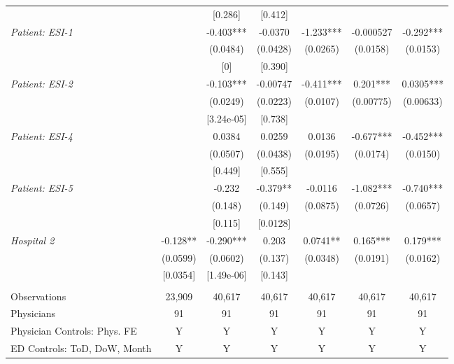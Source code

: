 \begin{table}[htbp]
{\begin{threeparttable}[t]
\begin{tabular}{lcccccc}
          &       & [0.286] & [0.412] &       &       &  \\
    \textit{Patient: ESI-1} &       & -0.403*** & -0.0370 & -1.233*** & -0.000527 & -0.292*** \\
          &       & (0.0484) & (0.0428) & (0.0265) & (0.0158) & (0.0153) \\
          &       & [0]   & [0.390] &       &       &  \\
    \textit{Patient: ESI-2} &       & -0.103*** & -0.00747 & -0.411*** & 0.201*** & 0.0305*** \\
          &       & (0.0249) & (0.0223) & (0.0107) & (0.00775) & (0.00633) \\
          &       & [3.24e-05] & [0.738] &       &       &  \\
    \textit{Patient: ESI-4} &       & 0.0384 & 0.0259 & 0.0136 & -0.677*** & -0.452*** \\
          &       & (0.0507) & (0.0438) & (0.0195) & (0.0174) & (0.0150) \\
          &       & [0.449] & [0.555] &       &       &  \\
    \textit{Patient: ESI-5} &       & -0.232 & -0.379** & -0.0116 & -1.082*** & -0.740*** \\
          &       & (0.148) & (0.149) & (0.0875) & (0.0726) & (0.0657) \\
          &       & [0.115] & [0.0128] &       &       &  \\
    \textit{Hospital 2} & -0.128** & -0.290*** & 0.203 & 0.0741** & 0.165*** & 0.179*** \\
          & (0.0599) & (0.0602) & (0.137) & (0.0348) & (0.0191) & (0.0162) \\
          & [0.0354] & [1.49e-06] & [0.143] &       &       &  \\
          &       &       &       &       &       &  \\
    Observations & 23,909 & 40,617 & 40,617 & 40,617 & 40,617 & 40,617 \\
    Physicians & 91    & 91    & 91    & 91    & 91    & 91 \\
    Physician Controls: Phys. FE & Y     & Y     & Y     & Y     & Y     & Y \\
    ED Controls: ToD, DoW, Month & Y     & Y     & Y     & Y     & Y     & Y \\
    \end{tabular}%
    \medskip
    \begin{tablenotes}
      \footnotesize

\end{tablenotes}
\end{threeparttable}}
\end{table}
